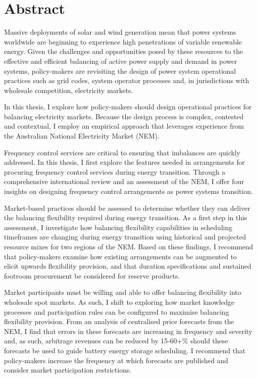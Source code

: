 \documentclass[12pt,a4paper,]{report}
\begin{document}

\hypertarget{abstract}{%
\chapter*{Abstract}\label{abstract}}

Massive deployments of solar and wind generation mean that power systems
worldwide are beginning to experience high penetrations of variable
renewable energy. Given the challenges and opportunities posed by these
resources to the effective and efficient balancing of active power
supply and demand in power systems, policy-makers are revisiting the
design of power system operational practices such as grid codes, system
operator processes and, in jurisdictions with wholesale competition,
electricity markets.

In this thesis, I explore how policy-makers should design operational
practices for balancing electricity markets. Because the design process
is complex, contested and contextual, I employ an empirical approach
that leverages experience from the Australian National Electricity
Market (NEM).

Frequency control services are critical to ensuring that imbalances are
quickly addressed. In this thesis, I first explore the features needed
in arrangements for procuring frequency control services during energy
transition. Through a comprehensive international review and an
assessment of the NEM, I offer four insights on designing frequency
control arrangements as power systems transition.

Market-based practices should be assessed to determine whether they can
deliver the balancing flexibility required during energy transition. As
a first step in this assessment, I investigate how balancing flexibility
capabilities in scheduling timeframes are changing during energy
transition using historical and projected resource mixes for two regions
of the NEM. Based on these findings, I recommend that policy-makers
examine how existing arrangements can be augmented to elicit upwards
flexibility provision, and that duration specifications and sustained
footroom procurement be considered for reserve products.

Market participants must be willing and able to offer balancing
flexibility into wholesale spot markets. As such, I shift to exploring
how market knowledge processes and participation rules can be configured
to maximise balancing flexibility provision. From an analysis of
centralised price forecasts from the NEM, I find that errors in these
forecasts are increasing in frequency and severity and, as such,
arbitrage revenues can be reduced by 15-60+\% should these forecasts be
used to guide battery energy storage scheduling. I recommend that
policy-makers increase the frequency at which forecasts are published
and consider market participation restrictions.
\end{document}
